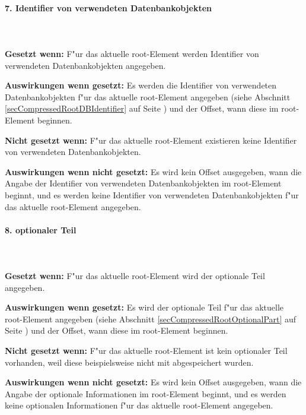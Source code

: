 \paragraph{7. Identifier von verwendeten Datenbankobjekten}

\ \\\\\noindent
\textbf{Gesetzt wenn:} F"ur das aktuelle root-Element werden Identifier von verwendeten Datenbankobjekten angegeben.

\bigskip\noindent
\textbf{Auswirkungen wenn gesetzt:}
Es werden die Identifier von verwendeten Datenbankobjekten f"ur das aktuelle root-Element angegeben (siehe Abschnitt \ref{secCompressedRootDBIdentifier} auf Seite \pageref{secCompressedRootDBIdentifier}) und der Offset, wann diese im root-Element beginnen.

\bigskip\noindent
\textbf{Nicht gesetzt wenn:} F"ur das aktuelle root-Element existieren keine Identifier von verwendeten Datenbankobjekten.

\bigskip\noindent
\textbf{Auswirkungen wenn nicht gesetzt:}
Es wird kein Offset ausgegeben, wann die Angabe der Identifier von verwendeten Datenbankobjekten im root-Element beginnt, und es werden keine Identifier von verwendeten Datenbankobjekten f"ur das aktuelle root-Element angegeben.


\paragraph{8. optionaler Teil}

\ \\\\\noindent
\textbf{Gesetzt wenn:} F"ur das aktuelle root-Element wird der optionale Teil angegeben.

\bigskip\noindent
\textbf{Auswirkungen wenn gesetzt:}
Es wird der optionale Teil f"ur das aktuelle root-Element angegeben (siehe Abschnitt \ref{secCompressedRootOptionalPart} auf Seite \pageref{secCompressedRootOptionalPart}) und der Offset, wann diese im root-Element beginnen.

\bigskip\noindent
\textbf{Nicht gesetzt wenn:} F"ur das aktuelle root-Element ist kein optionaler Teil vorhanden, weil diese beispielsweise nicht mit abgespeichert wurden.

\bigskip\noindent
\textbf{Auswirkungen wenn nicht gesetzt:}
Es wird kein Offset ausgegeben, wann die Angabe der optionale Informationen im root-Element beginnt, und es werden keine optionalen Informationen f"ur das aktuelle root-Element angegeben.


